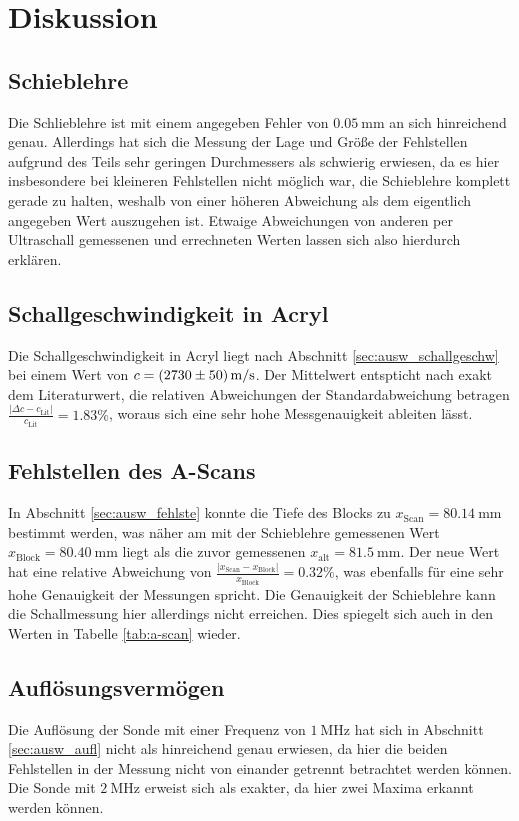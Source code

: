 \section{Diskussion}
\subsection{Schieblehre}
\label{sec:disk_schieb}
Die Schlieblehre ist mit einem angegeben Fehler von $\qty[]{0.05}{\milli\meter}$ an sich hinreichend genau.
Allerdings hat sich die Messung der Lage und Größe der Fehlstellen aufgrund des Teils sehr geringen Durchmessers als schwierig erwiesen, 
da es hier insbesondere bei kleineren Fehlstellen nicht möglich war, die Schieblehre komplett gerade zu halten,
weshalb von einer höheren Abweichung als dem eigentlich angegeben Wert auszugehen ist.
Etwaige Abweichungen von anderen per Ultraschall gemessenen und errechneten Werten lassen sich also hierdurch erklären.

\subsection{Schallgeschwindigkeit in Acryl}
Die Schallgeschwindigkeit in Acryl liegt nach Abschnitt \ref{sec:ausw_schallgeschw} bei einem Wert von $c = \qty{2730 +- 50}{\meter\per\second}$.
Der Mittelwert entspticht nach \cite[]{schall-acryl} exakt dem Literaturwert, die relativen Abweichungen der Standardabweichung betragen
$\frac{|\Delta c - c_\text{Lit}|}{c_\text{Lit}} = \num{1.83} \%$, woraus sich eine sehr hohe Messgenauigkeit ableiten lässt.

\subsection{Fehlstellen des A-Scans}
In Abschnitt \ref{sec:ausw_fehlste} konnte die Tiefe des Blocks zu $x_\text{Scan} = \qty{80.14}{\mm}$ bestimmt werden, 
was näher am mit der Schieblehre gemessenen Wert $x_\text{Block} = \qty{80.40}{\mm}$ liegt als die zuvor gemessenen $x_\text{alt} = \qty{81.5}{\mm}$.
Der neue Wert hat eine relative Abweichung von $\frac{|x_\text{Scan} - x_\text{Block}|}{x_\text{Block}} = \num{0.32} \%$,
was ebenfalls für eine sehr hohe Genauigkeit der Messungen spricht.
Die Genauigkeit der Schieblehre kann die  Schallmessung hier allerdings nicht erreichen.
Dies spiegelt sich auch in den Werten in Tabelle \ref{tab:a-scan} wieder.

\subsection{Auflösungsvermögen}
Die Auflösung der Sonde mit einer Frequenz von $\qty[]{1}{\mega\hertz}$ hat sich in Abschnitt \ref{sec:ausw_aufl} nicht als hinreichend 
genau erwiesen, da hier die beiden Fehlstellen in der Messung nicht von einander getrennt betrachtet werden können.
Die Sonde mit $\qty[]{2}{\mega\hertz}$ erweist sich als exakter, da hier zwei Maxima erkannt werden können.

